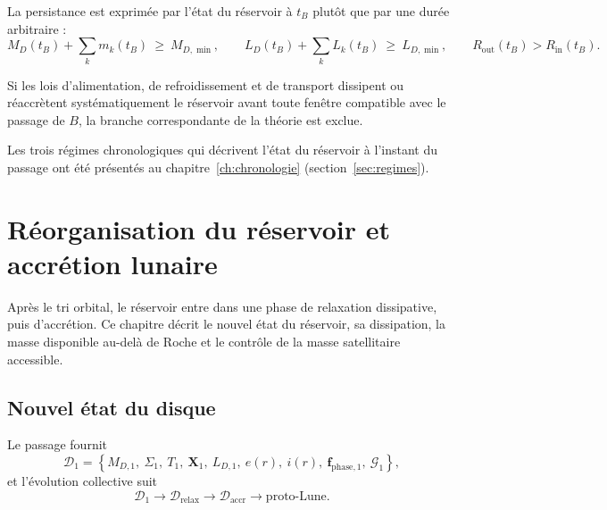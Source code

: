 \documentclass[11pt,a4paper,openany]{report}
\begin{document}
La persistance est exprimée par l'état du réservoir à $t_B$ plutôt que par une durée arbitraire :
\begin{equation}
M_D(t_B)+\sum_k m_k(t_B)\ \ge\ M_{D,\min},\qquad
L_D(t_B)+\sum_k L_k(t_B)\ \ge\ L_{D,\min},\qquad
R_{\mathrm{out}}(t_B)>R_{\mathrm{in}}(t_B).
\label{eq:persistance}
\end{equation}

\begin{falsif}
Si les lois d'alimentation, de refroidissement et de transport dissipent ou réaccrètent
systématiquement le réservoir avant toute fenêtre compatible avec le passage de $B$, la branche
correspondante de la théorie est exclue.
\end{falsif}


Les trois régimes chronologiques qui décrivent l'état du réservoir à l'instant du passage ont été
présentés au chapitre~\ref{ch:chronologie} (section~\ref{sec:regimes}).

\chapter{Réorganisation du réservoir et accrétion lunaire}
\label{ch:reorganisation}

Après le tri orbital, le réservoir entre dans une phase de relaxation dissipative, puis d'accrétion.
Ce chapitre décrit le nouvel état du réservoir, sa dissipation, la masse disponible au-delà de Roche
et le contrôle de la masse satellitaire accessible.

\section{Nouvel état du disque}

Le passage fournit
\begin{equation}
\mathcal{D}_1=\left\{M_{D,1},\ \Sigma_1,\ T_1,\ \mathbf{X}_1,\ L_{D,1},\ e(r),\ i(r),\
\mathbf{f}_{\mathrm{phase},1},\ \mathcal{G}_1\right\},
\label{eq:D1}
\end{equation}
et l'évolution collective suit
\begin{equation}
\mathcal{D}_1\longrightarrow\mathcal{D}_{\mathrm{relax}}\longrightarrow\mathcal{D}_{\mathrm{accr}}
\longrightarrow\text{proto-Lune}.
\label{eq:evolution}
\end{equation}
\end{document}
